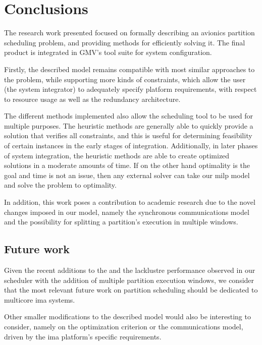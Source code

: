 \documentclass[main.tex]{subfiles}
\begin{document}
\section{Conclusions}
\label{sec:conclusion}


The research work presented focused on formally describing an avionics partition scheduling problem, and providing methods for efficiently solving it.
The final product is integrated in GMV's tool suite for system configuration.

Firstly, the described model remains compatible with most similar approaches to the problem, while supporting more kinds of constraints, which allow the user (the system integrator) to adequately specify platform requirements, with respect to resource usage as well as the redundancy architecture.

The different methods implemented also allow the scheduling tool to be used for multiple purposes.
The heuristic methods are generally able to quickly provide a solution that verifies all constraints, and this is useful for determining feasibility of certain instances in the early stages of integration.
Additionally, in later phases of system integration, the heuristic methods are able to create optimized solutions in a moderate amounts of time.
If on the other hand optimality is the goal and time is not an issue, then any external solver can take our \gls{milp} model and solve the problem to optimality.

In addition, this work poses a contribution to academic research due to the novel changes imposed in our model, namely the synchronous communications model and the possibility for splitting a partition's execution in multiple windows.

\subsection{Future work}

Given the recent additions to the  and the lacklustre performance observed in our scheduler with the addition of multiple partition execution windows, we consider that the most relevant future work on partition scheduling should be dedicated to multicore \gls{ima} systems.

Other smaller modifications to the described model would also be interesting to consider, namely on the optimization criterion or the communications model, driven by the \gls{ima} platform's specific requirements.
\end{document}
